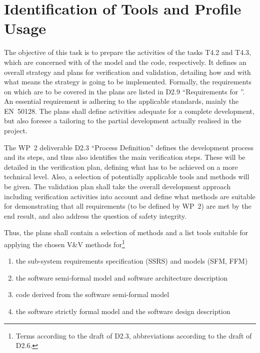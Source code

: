 \section{Identification of Tools and Profile Usage}
The objective of this task is to prepare the activities of the tasks
T4.2 and T4.3, which are concerned with \vv of the model and the code,
respectively. It defines an overall \vv strategy and plans for
verification and validation, detailing how and with what means the
strategy is going to be implemented. Formally, the requirements on \vv
which are to be covered in the plans are listed in D2.9 ``Requirements
for \VV''. An essential requirement is adhering to
the applicable standards, mainly the EN~50128. The plans shall define
activities adequate for a complete development, but also foresee a
tailoring to the partial development actually realised in the project.

The WP~2 deliverable D2.3 ``Process Definition'' defines the
development process and its steps, and thus also identifies the main
verification steps. These will be detailed in the verification plan,
defining what has to be achieved on a more technical level. Also, a
selection of potentially applicable tools and methods will be
given. The validation plan shall take the overall development approach
including verification activities into account and define what methods
are suitable for demonstrating that all requirements (to be defined by
WP~2) are met by the end result, and also address the question of
safety integrity.

Thus, the plans shall contain a selection of methods and a list tools
suitable for applying the chosen V\&V methods for\footnote{Terms
  according to the draft of D2.3, abbreviations according to the draft
  of D2.6.}
\begin{enumerate}
\item the sub-system requirements specification (SSRS) and models
  (SFM, FFM)
\item the software semi-formal model and software architecture
  description
\item code derived from the software semi-formal model
\item the software strictly formal model and the software design
  description
\end{enumerate}

